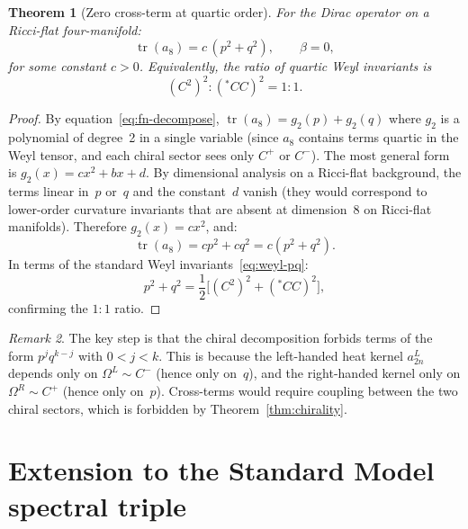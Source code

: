 \documentclass[12pt,a4paper]{article}
\newtheorem{theorem}{Theorem}[section]
\theoremstyle{definition}
\theoremstyle{remark}
\newtheorem{remark}[theorem]{Remark}
\newcommand{\tr}{\operatorname{tr}}
\begin{document}
\begin{theorem}[Zero cross-term at quartic order]
\label{thm:zero-pq}
For the Dirac operator on a Ricci-flat four-manifold:
\begin{equation}\label{eq:a8-result}
  \tr(a_8) = c\,(p^2 + q^2), \qquad \beta = 0,
\end{equation}
for some constant $c > 0$.  Equivalently, the ratio of quartic Weyl
invariants is
\begin{equation}\label{eq:ratio}
  (C^2)^2 : (\!{}^{\ast}\!CC)^2 = 1 {:} 1.
\end{equation}
\end{theorem}

\begin{proof}
By equation~\eqref{eq:fn-decompose}, $\tr(a_8) = g_2(p) + g_2(q)$ where
$g_2$ is a polynomial of degree~2 in a single variable (since $a_8$
contains terms quartic in the Weyl tensor, and each chiral sector sees
only $C^+$ or $C^-$).  The most general form is $g_2(x) = cx^2 + bx + d$.
By dimensional analysis on a Ricci-flat background, the terms linear in~$p$
or~$q$ and the constant~$d$ vanish (they would correspond to lower-order
curvature invariants that are absent at dimension~8 on Ricci-flat manifolds).
Therefore $g_2(x) = cx^2$, and:
\begin{equation}
  \tr(a_8) = cp^2 + cq^2 = c(p^2 + q^2).
\end{equation}
In terms of the standard Weyl invariants~\eqref{eq:weyl-pq}:
\begin{equation}
  p^2 + q^2 = \frac{1}{2}\bigl[(C^2)^2 + ({}^{\ast}\!CC)^2\bigr],
\end{equation}
confirming the $1{:}1$ ratio.
\end{proof}

\begin{remark}
The key step is that the chiral decomposition forbids terms of the form
$p^j q^{k-j}$ with $0 < j < k$.  This is because the left-handed heat
kernel $a_{2n}^L$ depends only on $\Omega^L \sim C^-$ (hence only on~$q$),
and the right-handed kernel only on $\Omega^R \sim C^+$ (hence only on~$p$).
Cross-terms would require coupling between the two chiral sectors, which is
forbidden by Theorem~\ref{thm:chirality}.
\end{remark}


\section{Extension to the Standard Model spectral triple}
\label{sec:sm}
\end{document}
